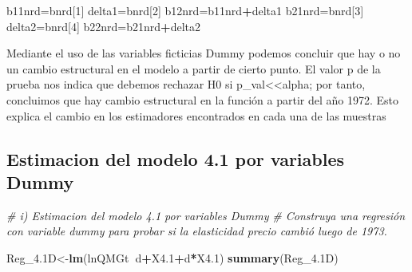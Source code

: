 \documentclass[
]{article}
\newenvironment{Shaded}{\begin{snugshade}}{\end{snugshade}}
\newcommand{\CommentTok}[1]{\textcolor[rgb]{0.56,0.35,0.01}{\textit{#1}}}
\newcommand{\DecValTok}[1]{\textcolor[rgb]{0.00,0.00,0.81}{#1}}
\newcommand{\FloatTok}[1]{\textcolor[rgb]{0.00,0.00,0.81}{#1}}
\newcommand{\KeywordTok}[1]{\textcolor[rgb]{0.13,0.29,0.53}{\textbf{#1}}}
\newcommand{\NormalTok}[1]{#1}
\newcommand{\OperatorTok}[1]{\textcolor[rgb]{0.81,0.36,0.00}{\textbf{#1}}}
\begin{document}
\begin{Shaded}
\begin{Highlighting}[]
\NormalTok{b11nrd=bnrd[}\DecValTok{1}\NormalTok{]}
\NormalTok{delta1=bnrd[}\DecValTok{2}\NormalTok{]}
\NormalTok{b12nrd=b11nrd}\OperatorTok{+}\NormalTok{delta1}
\NormalTok{b21nrd=bnrd[}\DecValTok{3}\NormalTok{]}
\NormalTok{delta2=bnrd[}\DecValTok{4}\NormalTok{]}
\NormalTok{b22nrd=b21nrd}\OperatorTok{+}\NormalTok{delta2}
\end{Highlighting}
\end{Shaded}

Mediante el uso de las variables ficticias Dummy podemos concluir que
hay o no un cambio estructural en el modelo a partir de cierto punto. El
valor p de la prueba nos indica que debemos rechazar H0 si
p\_val\textless\textless alpha; por tanto, concluimos que hay cambio
estructural en la función a partir del año 1972. Esto explica el cambio
en los estimadores encontrados en cada una de las muestras

\hypertarget{estimacion-del-modelo-4.1-por-variables-dummy}{%
\subsection{Estimacion del modelo 4.1 por variables
Dummy}\label{estimacion-del-modelo-4.1-por-variables-dummy}}

\begin{Shaded}
\begin{Highlighting}[]
\CommentTok{# i) Estimacion del modelo 4.1 por variables Dummy}
\CommentTok{# Construya una regresión con variable dummy para probar si la elasticidad precio cambió luego de 1973.}


\NormalTok{Reg_}\FloatTok{4.1}\NormalTok{D<-}\KeywordTok{lm}\NormalTok{(lnQMGt}\OperatorTok{~}\NormalTok{d}\OperatorTok{+}\NormalTok{X4}\FloatTok{.1}\OperatorTok{+}\NormalTok{d}\OperatorTok{*}\NormalTok{X4}\FloatTok{.1}\NormalTok{)}
\KeywordTok{summary}\NormalTok{(Reg_}\FloatTok{4.1}\NormalTok{D)}
\end{Highlighting}
\end{Shaded}
\end{document}
